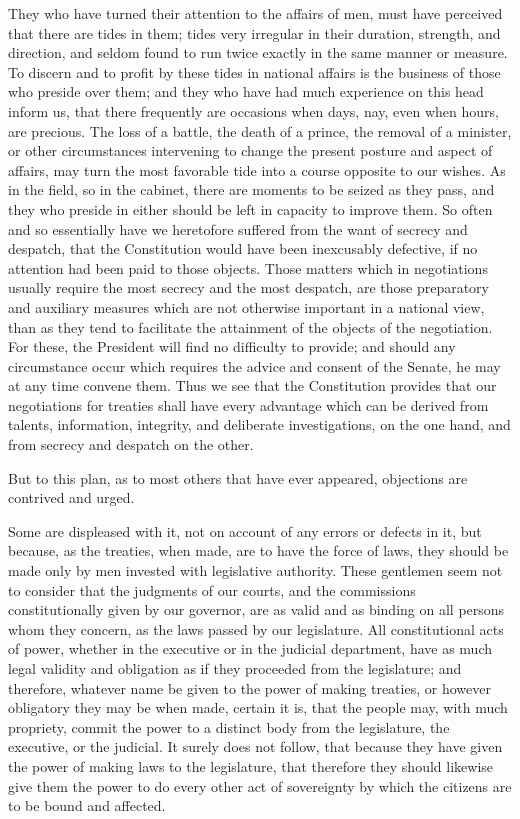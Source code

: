They who have turned their attention to the affairs of men, must have perceived that there are tides in them; tides very irregular in their duration, strength, and direction, and seldom found to run twice exactly in the same manner or measure. To discern and to profit by these tides in national affairs is the business of those who preside over them; and they who have had much experience on this head inform us, that there frequently are occasions when days, nay, even when hours, are precious. The loss of a battle, the death of a prince, the removal of a minister, or other circumstances intervening to change the present posture and aspect of affairs, may turn the most favorable tide into a course opposite to our wishes. As in the field, so in the cabinet, there are moments to be seized as they pass, and they who preside in either should be left in capacity to improve them. So often and so essentially have we heretofore suffered from the want of secrecy and despatch, that the Constitution would have been inexcusably defective, if no attention had been paid to those objects. Those matters which in negotiations usually require the most secrecy and the most despatch, are those preparatory and auxiliary measures which are not otherwise important in a national view, than as they tend to facilitate the attainment of the objects of the negotiation. For these, the President will find no difficulty to provide; and should any circumstance occur which requires the advice and consent of the Senate, he may at any time convene them. Thus we see that the Constitution provides that our negotiations for treaties shall have every advantage which can be derived from talents, information, integrity, and deliberate investigations, on the one hand, and from secrecy and despatch on the other.

But to this plan, as to most others that have ever appeared, objections are contrived and urged.

Some are displeased with it, not on account of any errors or defects in it, but because, as the treaties, when made, are to have the force of laws, they should be made only by men invested with legislative authority. These gentlemen seem not to consider that the judgments of our courts, and the commissions constitutionally given by our governor, are as valid and as binding on all persons whom they concern, as the laws passed by our legislature. All constitutional acts of power, whether in the executive or in the judicial department, have as much legal validity and obligation as if they proceeded from the legislature; and therefore, whatever name be given to the power of making treaties, or however obligatory they may be when made, certain it is, that the people may, with much propriety, commit the power to a distinct body from the legislature, the executive, or the judicial. It surely does not follow, that because they have given the power of making laws to the legislature, that therefore they should likewise give them the power to do every other act of sovereignty by which the citizens are to be bound and affected.

